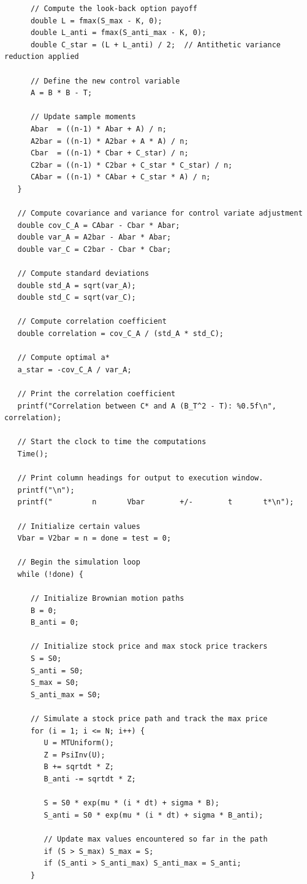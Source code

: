 \documentclass{report}
\begin{document}
\begin{lstlisting}
      // Compute the look-back option payoff 
      double L = fmax(S_max - K, 0);
      double L_anti = fmax(S_anti_max - K, 0);
      double C_star = (L + L_anti) / 2;  // Antithetic variance reduction applied

      // Define the new control variable
      A = B * B - T;

      // Update sample moments
      Abar  = ((n-1) * Abar + A) / n;
      A2bar = ((n-1) * A2bar + A * A) / n;
      Cbar  = ((n-1) * Cbar + C_star) / n;
      C2bar = ((n-1) * C2bar + C_star * C_star) / n;
      CAbar = ((n-1) * CAbar + C_star * A) / n;
   }

   // Compute covariance and variance for control variate adjustment
   double cov_C_A = CAbar - Cbar * Abar;
   double var_A = A2bar - Abar * Abar;
   double var_C = C2bar - Cbar * Cbar;

   // Compute standard deviations
   double std_A = sqrt(var_A);
   double std_C = sqrt(var_C);

   // Compute correlation coefficient
   double correlation = cov_C_A / (std_A * std_C);

   // Compute optimal a*
   a_star = -cov_C_A / var_A;

   // Print the correlation coefficient
   printf("Correlation between C* and A (B_T^2 - T): %0.5f\n", correlation);

   // Start the clock to time the computations
   Time();

   // Print column headings for output to execution window.
   printf("\n");
   printf("         n       Vbar        +/-        t       t*\n");

   // Initialize certain values
   Vbar = V2bar = n = done = test = 0;

   // Begin the simulation loop
   while (!done) {

      // Initialize Brownian motion paths
      B = 0;
      B_anti = 0;

      // Initialize stock price and max stock price trackers
      S = S0;
      S_anti = S0;
      S_max = S0;
      S_anti_max = S0;

      // Simulate a stock price path and track the max price
      for (i = 1; i <= N; i++) {
         U = MTUniform();
         Z = PsiInv(U);
         B += sqrtdt * Z;
         B_anti -= sqrtdt * Z;

         S = S0 * exp(mu * (i * dt) + sigma * B);
         S_anti = S0 * exp(mu * (i * dt) + sigma * B_anti);

         // Update max values encountered so far in the path
         if (S > S_max) S_max = S;  
         if (S_anti > S_anti_max) S_anti_max = S_anti;
      }


\end{lstlisting}
\end{document}
